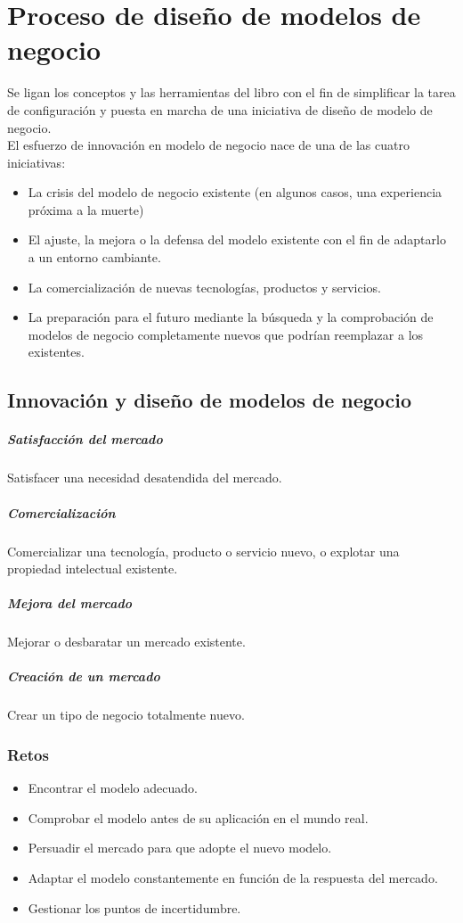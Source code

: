 \documentclass[11pt]{book}
\begin{document}
\chapter{Proceso de diseño de modelos de negocio}
Se ligan los conceptos y las herramientas del libro con el fin de simplificar la tarea de configuración y puesta en marcha de una iniciativa de diseño de modelo de negocio.\\
El esfuerzo de innovación en modelo de negocio nace de una de las cuatro iniciativas:
\begin{itemize}
\item La crisis del modelo de negocio existente (en algunos casos, una experiencia próxima a la muerte)
\item El ajuste, la mejora o la defensa del modelo existente con el fin de adaptarlo a un entorno cambiante.
\item La comercialización de nuevas tecnologías, productos y servicios.
\item La preparación para el futuro mediante la búsqueda y la comprobación de modelos de negocio completamente nuevos que podrían reemplazar a los existentes.
\end{itemize}
\section{Innovación y diseño de modelos de negocio}
\paragraph{Satisfacción del mercado}
Satisfacer una necesidad desatendida del mercado.
\paragraph{Comercialización}
Comercializar una tecnología, producto o servicio nuevo, o explotar una propiedad intelectual existente.
\paragraph{Mejora del mercado}
Mejorar o desbaratar un mercado existente.
\paragraph{Creación de un mercado}
Crear un tipo de negocio totalmente nuevo.
\subsection{Retos}
\begin{itemize}
\item Encontrar el modelo adecuado.
\item Comprobar el modelo antes de su aplicación en el mundo real.
\item Persuadir el mercado para que adopte el nuevo modelo.
\item Adaptar el modelo constantemente en función de la respuesta del mercado.
\item Gestionar los puntos de incertidumbre.
\end{itemize}
\end{document}
